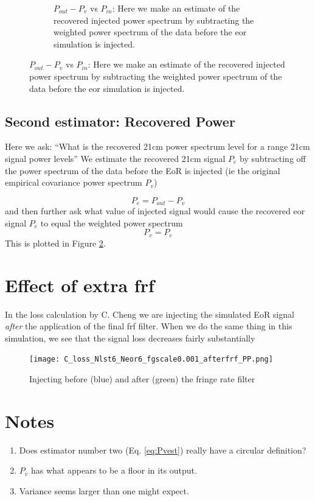 \documentclass{article}
\begin{document}
\begin{figure}[bth]
\begin{center}
\begin{subfigure}{0.45\textwidth}
     \caption{$P_{out}-P_v$ vs $P_{in}$: Here we make an estimate of the recovered injected power spectrum by    subtracting the weighted power spectrum of the data before the eor simulation is injected.}\label{fig:eorvin}
   \end{subfigure}
\end{center}
\end{figure}
\subsection*{Second estimator: Recovered Power} 
Here we ask: ``What is the recovered 21cm power spectrum level for a range 21cm signal power levels''  We estimate the recovered 21cm signal $P_e$ by subtracting off the power spectrum of the data before the EoR is injected (ie the original empirical covariance power spectrum $P_{v}$)

\begin{equation}
P_{e} = P_{out} - P_v
\label{eq:Pvest}
\end{equation}
and then further ask what value of injected signal would cause the recovered eor signal $P_e$ to equal the weighted power spectrum
\begin{equation}
P_v = P_e 
\end{equation}
This is plotted in Figure \ref{fig:eorvin}. 



\section*{Effect of extra frf}
In the loss calculation by C. Cheng we are injecting the simulated EoR signal \emph{after} the application of the final frf filter. When we do the same thing in this simulation, we see that the signal loss decreases fairly substantially
\begin{figure}[htb]
\centering
\texttt{[image: C\_loss\_Nlst6\_Neor6\_fgscale0.001\_afterfrf\_PP.png]}
\caption{Injecting before (blue) and after (green) the fringe rate filter}\label{fig:afterfrf}
\end{figure}


\section*{Notes}
\begin{enumerate}
\item Does estimator number two (Eq. \ref{eq:Pvest}) really have a circular definition?
\item  $P_v$ has what appears to be a floor in its output. 
\item Variance seems larger than one might expect.
\end{enumerate}
\end{document}

